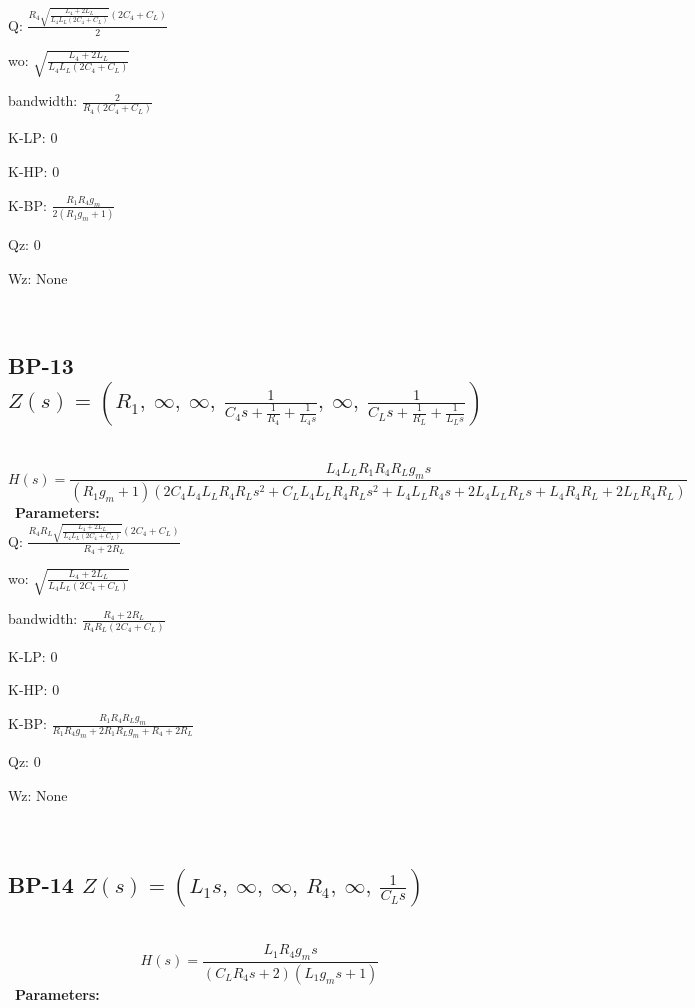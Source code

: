 \documentclass{article}
\begin{document}
Q: $\frac{R_{4} \sqrt{\frac{L_{4} + 2 L_{L}}{L_{4} L_{L} \left(2 C_{4} + C_{L}\right)}} \left(2 C_{4} + C_{L}\right)}{2}$\ 

wo: $\sqrt{\frac{L_{4} + 2 L_{L}}{L_{4} L_{L} \left(2 C_{4} + C_{L}\right)}}$\ 

bandwidth: $\frac{2}{R_{4} \left(2 C_{4} + C_{L}\right)}$\ 

K-LP: $0$\ 

K-HP: $0$\ 

K-BP: $\frac{R_{1} R_{4} g_{m}}{2 \left(R_{1} g_{m} + 1\right)}$\ 

Qz: $0$\ 

Wz: $\text{None}$\ 

\ 

\subsection{BP-13 $Z(s) = \left( R_{1}, \  \infty, \  \infty, \  \frac{1}{C_{4} s + \frac{1}{R_{4}} + \frac{1}{L_{4} s}}, \  \infty, \  \frac{1}{C_{L} s + \frac{1}{R_{L}} + \frac{1}{L_{L} s}}\right)$ } \ 
\textbf{\[H(s) = \frac{L_{4} L_{L} R_{1} R_{4} R_{L} g_{m} s}{\left(R_{1} g_{m} + 1\right) \left(2 C_{4} L_{4} L_{L} R_{4} R_{L} s^{2} + C_{L} L_{4} L_{L} R_{4} R_{L} s^{2} + L_{4} L_{L} R_{4} s + 2 L_{4} L_{L} R_{L} s + L_{4} R_{4} R_{L} + 2 L_{L} R_{4} R_{L}\right)}\] } \ 
\textbf{Parameters:}\\ 

Q: $\frac{R_{4} R_{L} \sqrt{\frac{L_{4} + 2 L_{L}}{L_{4} L_{L} \left(2 C_{4} + C_{L}\right)}} \left(2 C_{4} + C_{L}\right)}{R_{4} + 2 R_{L}}$\ 

wo: $\sqrt{\frac{L_{4} + 2 L_{L}}{L_{4} L_{L} \left(2 C_{4} + C_{L}\right)}}$\ 

bandwidth: $\frac{R_{4} + 2 R_{L}}{R_{4} R_{L} \left(2 C_{4} + C_{L}\right)}$\ 

K-LP: $0$\ 

K-HP: $0$\ 

K-BP: $\frac{R_{1} R_{4} R_{L} g_{m}}{R_{1} R_{4} g_{m} + 2 R_{1} R_{L} g_{m} + R_{4} + 2 R_{L}}$\ 

Qz: $0$\ 

Wz: $\text{None}$\ 

\ 

\subsection{BP-14 $Z(s) = \left( L_{1} s, \  \infty, \  \infty, \  R_{4}, \  \infty, \  \frac{1}{C_{L} s}\right)$ } \ 
\textbf{\[H(s) = \frac{L_{1} R_{4} g_{m} s}{\left(C_{L} R_{4} s + 2\right) \left(L_{1} g_{m} s + 1\right)}\] } \ 
\textbf{Parameters:}\\ 
\end{document}
